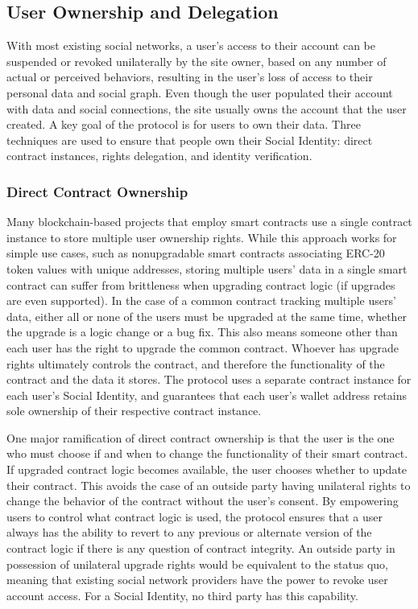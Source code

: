 \documentclass[12pt,letterpaper]{article}
\begin{document}
\subsection{User Ownership and Delegation}\label{sec:user_ownership and_delegation}

With most existing social networks, a user's access to their account can be suspended or
revoked unilaterally by the site owner, based on any number of actual or perceived
behaviors, resulting in the user's loss of access to their personal data and social graph.
Even though the user populated their account with data and social connections, the site
usually owns the account that the user created. A key goal of the protocol is for users to
own their data. Three techniques are used to ensure that people own their Social Identity:
direct contract instances, rights delegation, and identity verification.

\subsubsection{Direct Contract Ownership}

Many blockchain-based projects that employ smart contracts use a single contract instance
to store multiple user ownership rights. While this approach works for simple use cases,
such as nonupgradable smart contracts associating ERC-20\cite{erc20} token values with
unique addresses, storing multiple users' data in a single smart contract can suffer from
brittleness when upgrading contract logic (if upgrades are even supported). In the case of
a common contract tracking multiple users' data, either all or none of the users must be
upgraded at the same time, whether the upgrade is a logic change or a bug fix. This also
means someone other than each user has the right to upgrade the common contract. Whoever
has upgrade rights ultimately controls the contract, and therefore the functionality of
the contract and the data it stores. The protocol uses a separate contract instance for
each user's Social Identity, and guarantees that each user's wallet address retains sole
ownership of their respective contract instance.

One major ramification of direct contract ownership is that the user is the one who must
choose if and when to change the functionality of their smart contract. If upgraded
contract logic becomes available, the user chooses whether to update their contract. This
avoids the case of an outside party having unilateral rights to change the behavior of the
contract without the user's consent. By empowering users to control what contract logic is
used, the protocol ensures that a user always has the ability to revert to any previous or
alternate version of the contract logic if there is any question of contract integrity. An
outside party in possession of unilateral upgrade rights would be equivalent to the status
quo, meaning that existing social network providers have the power to revoke user account
access. For a Social Identity, no third party has this capability.
\end{document}
